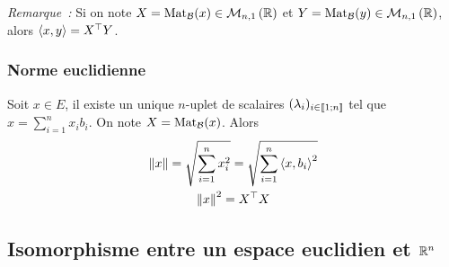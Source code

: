 \emph{Remarque~:} Si on note \(X=\mathrm{Mat}_{\mathcal{B}}(x) \in \mathcal{M}_{n,1}\left(\mathbb{R}\right)\) et 
\(Y=\mathrm{Mat}_{\mathcal{B}}(y) \in \mathcal{M}_{n,1}\left(\mathbb{R}\right)\), alors \(\left\langle{x},{y}\right\rangle = X^{\top}Y\).

\subsubsection{Norme euclidienne}

Soit \(x \in E\), il existe un unique \(n\)-uplet de scalaires 
\((\lambda_i)_{i \in \mathopen{\llbracket}1\mathclose{}\mathpunct{};n\mathclose{\rrbracket}}\) tel que \(x = \sum_{i=1}^n x_i 
b_i\). On note \(X = \mathrm{Mat}_{\mathcal{B}}(x)\). Alors
\begin{gather}
  \left\lVert x\right\rVert = \sqrt{\sum_{i=1}^n x_i^2}=\sqrt{\sum_{i=1}^n 
  \left\langle{x},{b_i}\right\rangle^2} \\
  \left\lVert x\right\rVert^2 = X^\top X
\end{gather}

\subsection{Isomorphisme entre un espace euclidien et \(\mathbb{R}^n\)}

